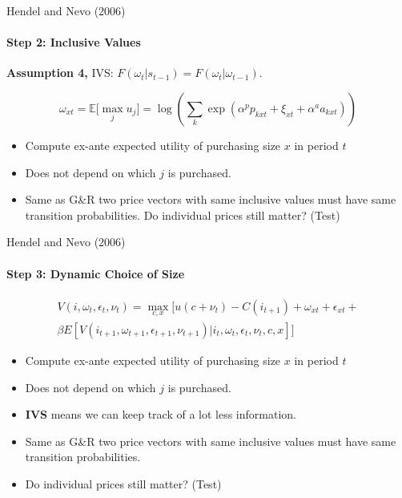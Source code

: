 \documentclass[11pt,aspectratio=169]{beamer}
\begin{document}
\begin{frame}{Hendel and Nevo (2006)}
\framesubtitle{Step 2: Inclusive Values}
\small
\textbf{Assumption 4,} IVS: $F(\omega_t | s_{t-1}) = F(\omega_t | \omega_{t-1})$.

\begin{equation*}
\omega_{xt} = \mathbb{E}\big[ \max_j u_j \big] = \log \left( \sum_k \exp(\alpha^p p_{kxt} + \xi_{xt} + \alpha^a a_{kxt}) \right)
\end{equation*}
\begin{itemize}\footnotesize
\item[$-$] Compute ex-ante expected utility of purchasing size $x$ in period $t$
\item[$-$] Does not depend on which $j$ is purchased.
\item[$-$] Same as G\&R two price vectors with same inclusive values must have same transition probabilities. Do individual prices still matter? (Test)
\end{itemize}
\end{frame}


\begin{frame}{Hendel and Nevo (2006)}
\framesubtitle{Step 3: Dynamic Choice of Size}
\small
\begin{multline*}
V(i,\omega_t,\epsilon_t,\nu_t) = \max_{c,x} [ u(c + \nu_t) - C(i_{t+1}) + \omega_{xt} + \epsilon_{xt} + \\
\beta E[V(i_{t+1},\omega_{t+1},\epsilon_{t+1},\nu_{t+1}) | i_t, \omega_t, \epsilon_t, \nu_t, c, x] ]
\end{multline*}

\begin{itemize}\footnotesize
\item[$-$] Compute ex-ante expected utility of purchasing size $x$ in period $t$
\item[$-$] Does not depend on which $j$ is purchased.
\item[$-$] \textbf{IVS} means we can keep track of a lot less information.
\item[$-$] Same as G\&R two price vectors with same inclusive values must have same transition probabilities.
\item[$-$] Do individual prices still matter? (Test)
\end{itemize}
\end{frame}

\end{document}

